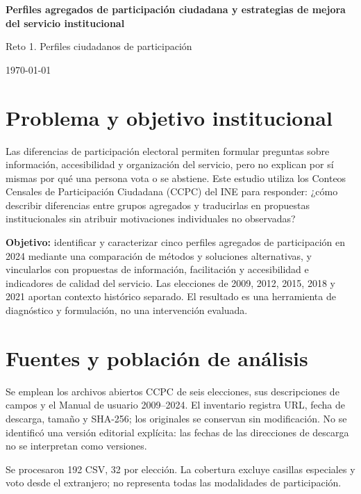 \documentclass[11pt]{article}
\begin{document}
\begin{center}
\textbf{Perfiles agregados de participación ciudadana y estrategias de mejora del servicio institucional}\par
Reto 1. Perfiles ciudadanos de participación\par
\today
\end{center}

\section{Problema y objetivo institucional}

Las diferencias de participación electoral permiten formular preguntas sobre información, accesibilidad y organización del servicio, pero no explican por sí mismas por qué una persona vota o se abstiene. Este estudio utiliza los Conteos Censales de Participación Ciudadana (CCPC) del INE para responder: ¿cómo describir diferencias entre grupos agregados y traducirlas en propuestas institucionales sin atribuir motivaciones individuales no observadas?

\textbf{Objetivo:} identificar y caracterizar cinco perfiles agregados de participación en 2024 mediante una comparación de métodos y soluciones alternativas, y vincularlos con propuestas de información, facilitación y accesibilidad e indicadores de calidad del servicio. Las elecciones de 2009, 2012, 2015, 2018 y 2021 aportan contexto histórico separado. El resultado es una herramienta de diagnóstico y formulación, no una intervención evaluada.

\section{Fuentes y población de análisis}

Se emplean los archivos abiertos CCPC de seis elecciones, sus descripciones de campos y el Manual de usuario 2009--2024. El inventario registra URL, fecha de descarga, tamaño y SHA-256; los originales se conservan sin modificación. No se identificó una versión editorial explícita: las fechas de las direcciones de descarga no se interpretan como versiones.

Se procesaron 192 CSV, 32 por elección. La cobertura excluye casillas especiales y voto desde el extranjero; no representa todas las modalidades de participación.
\end{document}
